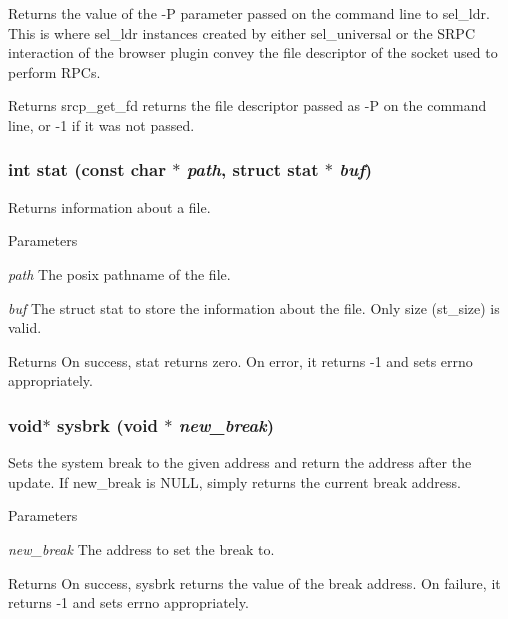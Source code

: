 \label{group__syscalls_ga09d2f0c23245cbe6d78e532bbb7644a0}
Returns the value of the -\/P parameter passed on the command line to sel\_\-ldr. This is where sel\_\-ldr instances created by either sel\_\-universal or the SRPC interaction of the browser plugin convey the file descriptor of the socket used to perform RPCs. \begin{DoxyReturn}{Returns}
srcp\_\-get\_\-fd returns the file descriptor passed as -\/P on the command line, or -\/1 if it was not passed. 
\end{DoxyReturn}
\hypertarget{group__syscalls_ga3dc1b07404b646712a144e2057359876}{
\subsubsection[{stat}]{\setlength{\rightskip}{0pt plus 5cm}int stat (const char $\ast$ {\em path}, \/  struct stat $\ast$ {\em buf})}}
\label{group__syscalls_ga3dc1b07404b646712a144e2057359876}
Returns information about a file. 
\begin{DoxyParams}{Parameters}
\item[{\em path}]The posix pathname of the file. \item[{\em buf}]The struct stat to store the information about the file. Only size (st\_\-size) is valid. \end{DoxyParams}
\begin{DoxyReturn}{Returns}
On success, stat returns zero. On error, it returns -\/1 and sets errno appropriately. 
\end{DoxyReturn}
\hypertarget{group__syscalls_gafdb60e6e9d2dd663e3cc8a13ef796877}{
\subsubsection[{sysbrk}]{\setlength{\rightskip}{0pt plus 5cm}void$\ast$ sysbrk (void $\ast$ {\em new\_\-break})}}
\label{group__syscalls_gafdb60e6e9d2dd663e3cc8a13ef796877}
Sets the system break to the given address and return the address after the update. If new\_\-break is NULL, simply returns the current break address. 
\begin{DoxyParams}{Parameters}
\item[{\em new\_\-break}]The address to set the break to. \end{DoxyParams}
\begin{DoxyReturn}{Returns}
On success, sysbrk returns the value of the break address. On failure, it returns -\/1 and sets errno appropriately. 
\end{DoxyReturn}
